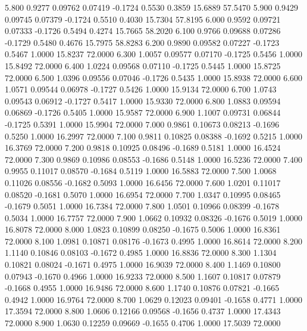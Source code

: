    5.800   0.9277   0.09762   0.07419  -0.1724   0.5530   0.3859  15.6889  57.5470
   5.900   0.9429   0.09745   0.07379  -0.1724   0.5510   0.4030  15.7304  57.8195
   6.000   0.9592   0.09721   0.07333  -0.1726   0.5494   0.4274  15.7665  58.2020
   6.100   0.9766   0.09688   0.07286  -0.1729   0.5480   0.4676  15.7975  58.8283
   6.200   0.9890   0.09582   0.07227  -0.1723   0.5467   1.0000  15.8237  72.0000
   6.300   1.0057   0.09577   0.07170  -0.1725   0.5456   1.0000  15.8492  72.0000
   6.400   1.0224   0.09568   0.07110  -0.1725   0.5445   1.0000  15.8725  72.0000
   6.500   1.0396   0.09556   0.07046  -0.1726   0.5435   1.0000  15.8938  72.0000
   6.600   1.0571   0.09544   0.06978  -0.1727   0.5426   1.0000  15.9134  72.0000
   6.700   1.0743   0.09543   0.06912  -0.1727   0.5417   1.0000  15.9330  72.0000
   6.800   1.0883   0.09594   0.06869  -0.1726   0.5405   1.0000  15.9587  72.0000
   6.900   1.1007   0.09731   0.06844  -0.1725   0.5391   1.0000  15.9904  72.0000
   7.000   0.9861   0.10673   0.08213  -0.1696   0.5250   1.0000  16.2997  72.0000
   7.100   0.9811   0.10825   0.08388  -0.1692   0.5215   1.0000  16.3769  72.0000
   7.200   0.9818   0.10925   0.08496  -0.1689   0.5181   1.0000  16.4524  72.0000
   7.300   0.9869   0.10986   0.08553  -0.1686   0.5148   1.0000  16.5236  72.0000
   7.400   0.9955   0.11017   0.08570  -0.1684   0.5119   1.0000  16.5883  72.0000
   7.500   1.0068   0.11026   0.08556  -0.1682   0.5093   1.0000  16.6456  72.0000
   7.600   1.0201   0.11017   0.08520  -0.1681   0.5070   1.0000  16.6954  72.0000
   7.700   1.0347   0.10995   0.08465  -0.1679   0.5051   1.0000  16.7384  72.0000
   7.800   1.0501   0.10966   0.08399  -0.1678   0.5034   1.0000  16.7757  72.0000
   7.900   1.0662   0.10932   0.08326  -0.1676   0.5019   1.0000  16.8078  72.0000
   8.000   1.0823   0.10899   0.08250  -0.1675   0.5006   1.0000  16.8361  72.0000
   8.100   1.0981   0.10871   0.08176  -0.1673   0.4995   1.0000  16.8614  72.0000
   8.200   1.1140   0.10846   0.08103  -0.1672   0.4985   1.0000  16.8836  72.0000
   8.300   1.1304   0.10821   0.08024  -0.1671   0.4975   1.0000  16.9039  72.0000
   8.400   1.1469   0.10800   0.07943  -0.1670   0.4966   1.0000  16.9233  72.0000
   8.500   1.1607   0.10817   0.07879  -0.1668   0.4955   1.0000  16.9486  72.0000
   8.600   1.1740   0.10876   0.07821  -0.1665   0.4942   1.0000  16.9764  72.0000
   8.700   1.0629   0.12023   0.09401  -0.1658   0.4771   1.0000  17.3594  72.0000
   8.800   1.0606   0.12166   0.09568  -0.1656   0.4737   1.0000  17.4343  72.0000
   8.900   1.0630   0.12259   0.09669  -0.1655   0.4706   1.0000  17.5039  72.0000

